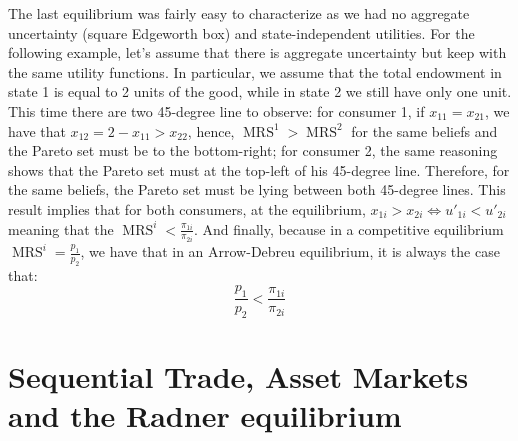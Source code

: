 \documentclass[12pt]{report}
\begin{document}
The last equilibrium was fairly easy to characterize as  we had no aggregate uncertainty (square Edgeworth box) and state-independent utilities. For the following example, let's assume that there is aggregate uncertainty but keep with the same utility functions. In particular, we assume that the total endowment in state 1 is equal to 2 units of the good, while in state 2 we still have only one unit. This time there are two 45-degree line to observe: for consumer 1, if $x_{11} = x_{21}$, we have that $x_{12} = 2 - x_{11} > x_{22}$, hence, $\operatorname{MRS}^1 > \operatorname{MRS}^2$ for the same beliefs and the Pareto set must be to the bottom-right; for consumer 2, the same reasoning shows that the Pareto set must at the top-left of his 45-degree line. Therefore, for the same beliefs, the Pareto set must be lying between both 45-degree lines. This result implies that for both consumers, at the equilibrium, $x_{1i}>x_{2i} \Leftrightarrow u'_{1i} < u'_{2i}$ meaning that the $\operatorname{MRS}^i < \frac{\pi_{1i}}{\pi_{2i}}$. And finally, because in a competitive equilibrium $\operatorname{MRS}^i = \frac{p_1}{p_2}$, we have that in an Arrow-Debreu equilibrium, it is always the case that: $$\frac{p_1}{p_2} < \frac{\pi_{1i}}{\pi_{2i}} $$

\section{Sequential Trade, Asset Markets and the Radner equilibrium}
\end{document}
